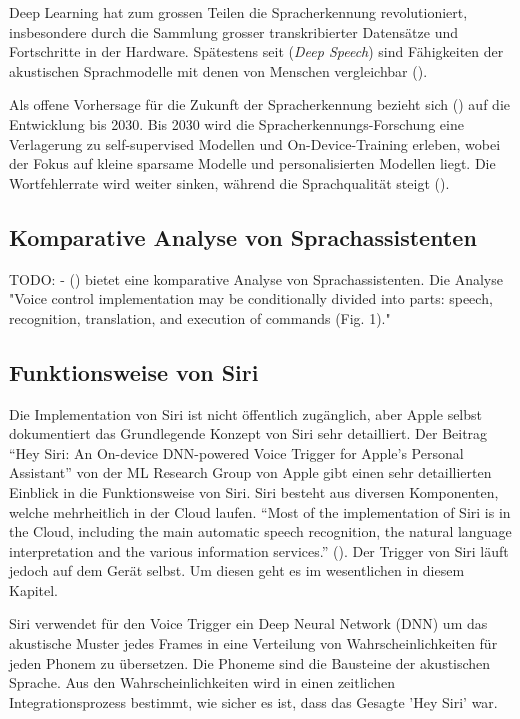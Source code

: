 \documentclass[11pt,a4paper]{article}
\begin{document}
\noindent \newline

\noindent \newline
Deep Learning hat zum grossen Teilen die Spracherkennung revolutioniert, insbesondere durch die 
Sammlung grosser transkribierter Datensätze und Fortschritte in der Hardware. Spätestens seit 
(\textit{Deep Speech}) sind Fähigkeiten der akustischen Sprachmodelle mit denen von Menschen
vergleichbar (\cite{hannun2021history}). 

\noindent \newline
Als offene Vorhersage für die Zukunft der Spracherkennung bezieht sich (\cite{hannun2021history}) 
auf die Entwicklung bis 2030. Bis 2030 wird die Spracherkennungs-Forschung eine Verlagerung zu 
self-supervised Modellen und On-Device-Training erleben, wobei der Fokus auf kleine sparsame Modelle
und personalisierten Modellen liegt. Die Wortfehlerrate wird weiter sinken, während die 
Sprachqualität steigt (\cite{hannun2021history}).

\subsection{Komparative Analyse von Sprachassistenten}
TODO: - (\cite{matarneh2017speechrecognition}) bietet eine komparative Analyse von 
Sprachassistenten. Die Analyse "Voice control implementation may be conditionally divided into 
parts: speech, recognition, translation, and execution of commands (Fig. 1)."

\subsection{Funktionsweise von Siri}
Die Implementation von Siri ist nicht öffentlich zugänglich, aber Apple selbst dokumentiert 
das Grundlegende Konzept von Siri sehr detailliert. Der Beitrag ``Hey Siri: An On-device DNN-powered 
Voice Trigger for Apple’s Personal Assistant'' \cite{siri2017hey} von der ML Research Group von 
Apple gibt einen sehr detaillierten Einblick in die Funktionsweise von Siri. Siri besteht aus
diversen Komponenten, welche mehrheitlich in der Cloud laufen. ``Most of the implementation of Siri 
is in the Cloud, including the main automatic speech recognition, the natural language 
interpretation and the various information services.'' (\cite{siri2017hey}). Der Trigger von Siri
läuft jedoch auf dem Gerät selbst. Um diesen geht es im wesentlichen in diesem Kapitel.

\noindent \newline
Siri verwendet für den Voice Trigger ein Deep Neural Network (DNN) um das akustische Muster jedes 
Frames in eine Verteilung von Wahrscheinlichkeiten für jeden Phonem zu übersetzen. Die Phoneme sind 
die Bausteine der akustischen Sprache. Aus den Wahrscheinlichkeiten wird in einen zeitlichen 
Integrationsprozess bestimmt, wie sicher es ist, dass das Gesagte 'Hey Siri' war.
\end{document}
